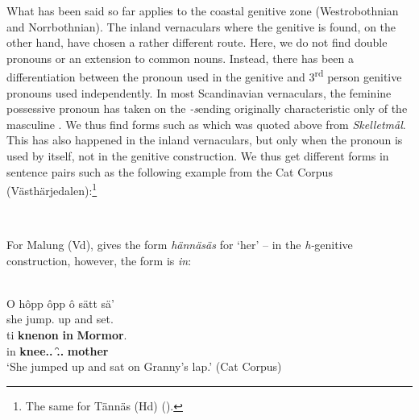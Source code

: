 What has been said so far applies to the coastal genitive zone (Westrobothnian and Norrbothnian). The inland vernaculars where the genitive is found, on the other hand, have chosen a rather different route. Here, we do not find double pronouns or an extension to common nouns. Instead, there has been a differentiation between the pronoun used in the genitive and 3\textsuperscript{rd} person genitive pronouns used independently. In most Scandinavian vernaculars, the feminine possessive pronoun has taken on the\textit{ {}-s}\textstyleLinguisticExample{ }ending originally characteristic only of the masculine . We thus find forms such as  which was quoted above from \textit{Skelletmål}. This has also happened in the inland vernaculars, but only when the pronoun is used by itself, not in the genitive construction. We thus get different forms in sentence pairs such as the following example from the Cat Corpus (Västhärjedalen):\footnote{ The same for Tännäs (Hd) (\citealt[22]{Olofsson1999}).}

\ea%
\\

\z 
\z

For Malung (Vd), \citet[2:211]{Levander1925} gives the form \textit{hännäsäs} for ‘her’ – in the \textit{h-}genitive construction, however, the form is \textit{in}: 


\ea%
\\
\gll O  hôpp  ôpp  ô  sätt  sä’  \\
she  jump.{\pst}  up  and  set.{\pst}  {}  \\
\gll ti  \textbf{knenon} \textbf{in} \textbf{Mormor}.\\
in  \textbf{knee.{}.{\pl}} \textbf{{\pda}.{\f}.{\gen}} \textbf{mother}\\
\glt ‘She jumped up and sat on Granny’s lap.’ (Cat Corpus)
\z

